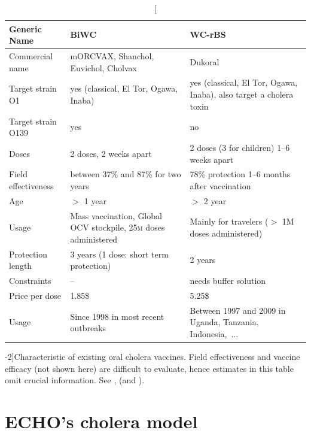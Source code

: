  \begin{table}[h]
\centering\small
\label{tab:prior}
\begin{tabular}{lp{40mm}p{40mm}}
\toprule
Generic Name &  BiWC & WC-rBS\\ 
\midrule
Commercial name   &  mORCVAX, Shanchol,  Euvichol, Cholvax & Dukoral  \\
Target strain O1 &   yes (classical, El Tor, Ogawa, Inaba)& yes (classical, El Tor, Ogawa, Inaba), also  target a cholera toxin  \\
Target strain O139   &  yes &      no     \\
Doses   &  2 doses, 2 weeks apart & 2 doses (3 for children) 1--6 weeks apart  \\
Field effectiveness  & between 37\% and 87\% for two years & 78\% protection 1--6 months after vaccination\\
Age   &  $>$ 1 year & $>$ 2 year      \\
Usage & Mass vaccination, Global OCV stockpile, 25\textsc{m} doses administered & Mainly for travelers ($>$ 1M doses administered)\\
Protection length & 3 years (1 dose: short term protection) & 2 years\\
Constraints & -- & needs buffer solution\\
Price per dose & 1.85\$ & 5.25\$ \\ 
Usage & Since 1998 in most recent outbreaks & Between 1997 and 2009 in Uganda, Tanzania, Indonesia,~... \\
\bottomrule
\end{tabular}
\caption[Characteristic of existing oral cholera vaccines][-2\baselineskip]{Characteristic of existing oral cholera vaccines. Field effectiveness and vaccine efficacy (not shown here) are difficult to evaluate, hence estimates in this table omit crucial information. See ,  (and ).}%
\label{tab:vacc}
\end{table}

\section{ECHO's cholera model}

